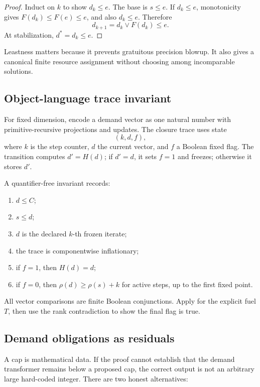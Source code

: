 \begin{proof}
Induct on \(k\) to show \(d_k\le e\).  The base is \(s\le e\).  If \(d_k\le e\), monotonicity gives \(F(d_k)\le F(e)\le e\), and also \(d_k\le e\).  Therefore
\[
 d_{k+1}=d_k\vee F(d_k)\le e.
\]
At stabilization, \(d^*=d_k\le e\).
\end{proof}

Leastness matters because it prevents gratuitous precision blowup.  It also gives a canonical finite resource assignment without choosing among incomparable solutions.

\subsection{Object-language trace invariant}

For fixed dimension, encode a demand vector as one natural number with primitive-recursive projections and updates.  The closure trace uses state
\[
 (k,d,f),
\]
where \(k\) is the step counter, \(d\) the current vector, and \(f\) a Boolean fixed flag.  The transition computes \(d'=H(d)\); if \(d'=d\), it sets \(f=1\) and freezes; otherwise it stores \(d'\).

A quantifier-free invariant records:
\begin{enumerate}
\item \(d\le C\);
\item \(s\le d\);
\item \(d\) is the declared \(k\)-th frozen iterate;
\item the trace is componentwise inflationary;
\item if \(f=1\), then \(H(d)=d\);
\item if \(f=0\), then \(\rho(d)\ge\rho(s)+k\) for active steps, up to the first fixed point.
\end{enumerate}
All vector comparisons are finite Boolean conjunctions.  Apply  for the explicit fuel \(T\), then use the rank contradiction to show the final flag is true.

\subsection{Demand obligations as residuals}

A cap is mathematical data.  If the proof cannot establish that the demand transformer remains below a proposed cap, the correct output is not an arbitrary large hard-coded integer.  There are two honest alternatives:

